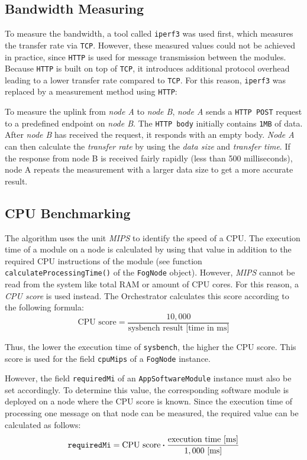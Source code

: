 \subsection{Bandwidth Measuring\label{sec:measuring-bandwidth}}
To measure the bandwidth, a tool called \texttt{iperf3} was used first, which measures the transfer rate via \texttt{TCP}.
However, these measured values could not be achieved in practice, since \texttt{HTTP} is used for message transmission between the modules.
Because \texttt{HTTP} is built on top of \texttt{TCP}, it introduces additional protocol overhead leading to a lower transfer rate compared to \texttt{TCP}.
For this reason, \texttt{iperf3} was replaced by a measurement method using \texttt{HTTP}:

To measure the uplink from \textit{node A} to \textit{node B}, \textit{node A} sends a \texttt{HTTP POST} request to a predefined endpoint on \textit{node B}. The \texttt{HTTP body} initially contains \texttt{1MB} of data. After \textit{node B} has received the request, it responds with an empty body. \textit{Node A} can then calculate the \textit{transfer rate} by using the \textit{data size} and \textit{transfer time}.
If the response from node B is received fairly rapidly (less than 500 milliseconds), node A repeats the measurement with a larger data size to get a more accurate result.

\subsection{CPU Benchmarking\label{sec:benchmark-cpu}}
The algorithm uses the unit \textit{MIPS} to identify the speed of a CPU.
The execution time of a module on a node is calculated by using that value in addition to the required CPU instructions of the module (see function \texttt{calculateProcessingTime()} of the \texttt{FogNode} object).
However, \textit{MIPS} cannot be read from the system like total RAM or amount of CPU cores.
For this reason, a \textit{CPU score} is used instead. The Orchestrator calculates this score according to the following formula:
\[\textrm{CPU score} = \frac{10,000}{\textrm{sysbench result [time in ms]}}\]

Thus, the lower the execution time of \texttt{sysbench}, the higher the CPU score. This score is used for the field \texttt{cpuMips} of a \texttt{FogNode} instance.

However, the field \texttt{requiredMi} of an \texttt{AppSoftwareModule} instance must also be set accordingly. To determine this value, the corresponding software module is deployed on a node where the CPU score is known.
Since the execution time of processing one message on that node can be measured, the required value can be calculated as follows:
\[\textrm{\texttt{requiredMi}} = \textrm{CPU score} \boldsymbol{\cdot} \frac{\textrm{execution time [ms]}}{1,000 \textrm{ [ms]}}\]


